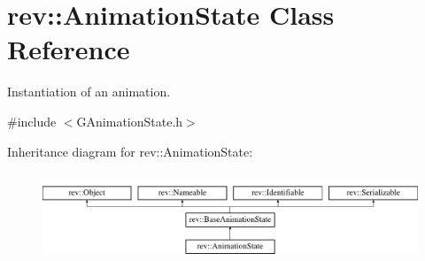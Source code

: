\hypertarget{classrev_1_1_animation_state}{}\section{rev\+::Animation\+State Class Reference}
\label{classrev_1_1_animation_state}


Instantiation of an animation.  




{\ttfamily \#include $<$G\+Animation\+State.\+h$>$}

Inheritance diagram for rev\+::Animation\+State\+:\begin{figure}[H]
\begin{center}
\leavevmode
\includegraphics[height=2.692308cm]{classrev_1_1_animation_state}
\end{center}
\end{figure}
